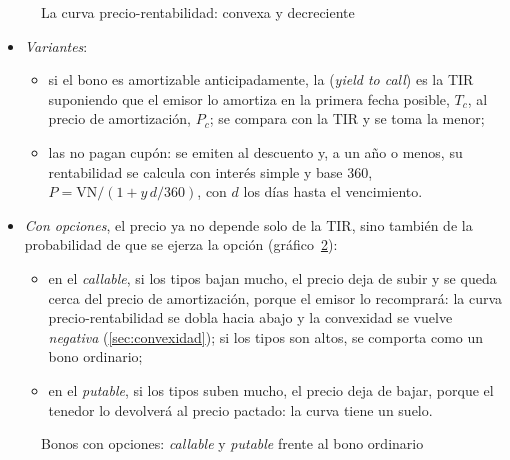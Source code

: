 \documentclass[11pt]{article}
\begin{document}
\begin{figure}[H]
\centering
\caption{La curva precio-rentabilidad: convexa y decreciente}\label{fig:precio-rentabilidad}
\end{figure}

\begin{itemize}
\item \emph{Variantes}:
  \begin{itemize}
  \item si el bono es amortizable anticipadamente, la  (\emph{yield to call}) es la TIR suponiendo que el emisor lo amortiza en la primera fecha posible, $T_c$, al precio de amortización, $P_c$; se compara con la TIR y se toma la menor;
  \item las  no pagan cupón: se emiten al descuento y, a un año o menos, su rentabilidad se calcula con interés simple y base 360, $P=\mathrm{VN}/(1+y\,d/360)$, con $d$ los días hasta el vencimiento.
  \end{itemize}
\item \emph{Con opciones}, el precio ya no depende solo de la TIR, sino también de la probabilidad de que se ejerza la opción (gráfico~\ref{fig:opciones-bono})\nocite{AnalystNotes2022Callable}:
  \begin{itemize}
  \item en el \emph{callable}, si los tipos bajan mucho, el precio deja de subir y se queda cerca del precio de amortización, porque el emisor lo recomprará: la curva precio-rentabilidad se dobla hacia abajo y la convexidad se vuelve \emph{negativa} (\ref{sec:convexidad}); si los tipos son altos, se comporta como un bono ordinario;
  \item en el \emph{putable}, si los tipos suben mucho, el precio deja de bajar, porque el tenedor lo devolverá al precio pactado: la curva tiene un suelo.
  \end{itemize}
\end{itemize}

\begin{figure}[H]
\centering
\caption{Bonos con opciones: \emph{callable} y \emph{putable} frente al bono ordinario}\label{fig:opciones-bono}
\end{figure}
\end{document}
